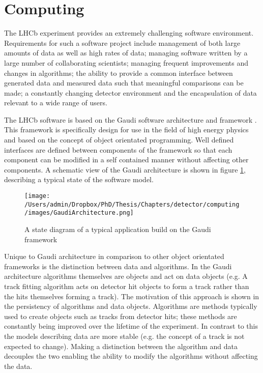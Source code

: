 \section{Computing}

The LHCb experiment provides an extremely challenging software environment. Requirements for such a software project include management of both large amounts of data as well as high rates of data; managing software written by a large number of collaborating scientists; managing frequent improvements and changes in algorithms; the ability to provide a common interface between generated data and measured data such that meaningful comparisons can be made; a constantly changing detector environment and the encapsulation of data relevant to a wide range of users.

The LHCb software is based on the Gaudi software architecture and framework \cite{Antunes-Nobrega:835156}. This framework is specifically design for use in the field of high energy physics and based on the concept of object orientated programming. Well defined interfaces are defined between components of the framework so that each component can be modified in a self contained manner without affecting other components. A schematic view of the Gaudi architecture is shown in figure \ref{fig: state of gaudi appliaction}, describing a typical state of the software model. 

\begin{figure}[h]
	\texttt{[image: /Users/admin/Dropbox/PhD/Thesis/Chapters/detector/computing/images/GaudiArchitecture.png]}
	\caption{A state diagram of a typical application build on the Gaudi framework}
	\label{fig: state of gaudi appliaction}
\end{figure}

Unique to Gaudi architecture in comparison to other object orientated frameworks is the distinction between data and algorithms. In the Gaudi architecture algorithms themselves are objects and act on data objects (e.g. A track fitting algorithm acts on detector hit objects to form a track rather than the hits themselves forming a track). The motivation of this approach is shown in the persistency of algorithms and data objects. Algorithms are methods typically used to create objects such as tracks from detector hits; these methods are constantly being improved over the lifetime of the experiment. In contrast to this the models describing data are more stable (e.g. the concept of a track is not expected to change). Making a distinction between the algorithm and data decouples the two enabling the ability to modify the algorithms without affecting the data.


